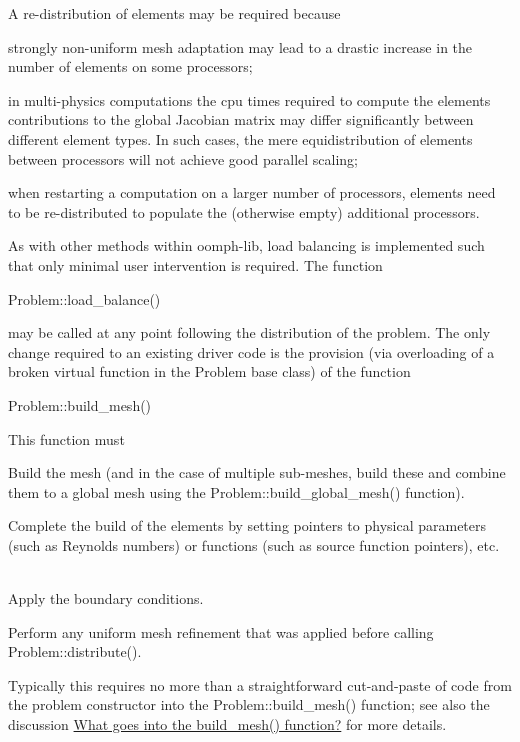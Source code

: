 A re-\/distribution of elements may be required because
\begin{DoxyEnumerate}
\item strongly non-\/uniform mesh adaptation may lead to a drastic increase in the number of elements on some processors; ~\newline
~\newline

\item in multi-\/physics computations the cpu times required to compute the elements\textquotesingle{} contributions to the global Jacobian matrix may differ significantly between different element types. In such cases, the mere equidistribution of elements between processors will not achieve good parallel scaling; ~\newline
~\newline

\item when restarting a computation on a larger number of processors, elements need to be re-\/distributed to populate the (otherwise empty) additional processors.
\end{DoxyEnumerate}As with other methods within {\ttfamily oomph-\/lib}, load balancing is implemented such that only minimal user intervention is required. The function 
\begin{DoxyCode}
Problem::load\_balance() 
\end{DoxyCode}
 may be called at any point following the distribution of the problem. The only change required to an existing driver code is the provision (via overloading of a broken virtual function in the Problem base class) of the function 
\begin{DoxyCode}
Problem::build\_mesh()
\end{DoxyCode}
 This function must
\begin{DoxyEnumerate}
\item Build the mesh (and in the case of multiple sub-\/meshes, build these and combine them to a global mesh using the {\ttfamily Problem\+::build\+\_\+global\+\_\+mesh()} function). ~\newline
~\newline

\item Complete the build of the elements by setting pointers to physical parameters (such as Reynolds numbers) or functions (such as source function pointers), etc. ~\newline
~\newline

\item Apply the boundary conditions. ~\newline
~\newline

\item Perform any uniform mesh refinement that was applied before calling {\ttfamily Problem\+::distribute()}.
\end{DoxyEnumerate}Typically this requires no more than a straightforward cut-\/and-\/paste of code from the problem constructor into the {\ttfamily Problem\+::build\+\_\+mesh()} function; see also the discussion \hyperlink{index_What}{What goes into the build\+\_\+mesh() function?} for more details.

